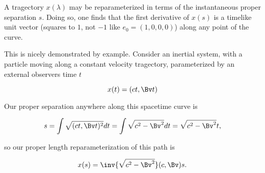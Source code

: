 %
%
%

A tragectory $x(\lambda)$ may be reparameterized in terms of the instantaneous proper separation $s$.  Doing so, one finds that the first derivative of $x(s)$ is a timelike unit vector (squares to $1$, not $-1$ like $e_0 = (1, 0, 0, 0)$) along any point of the curve.

This is nicely demonstrated by example.
%
%
Consider an inertial system, with a particle moving along a constant velocity tragectory, parameterized by an external observers time $t$

\begin{equation}\label{eqn:grahamSchmidtLorentz:440}
x(t) = (c t, \Bv t)
\end{equation}

Our proper separation anywhere along this spacetime curve is

\begin{equation}\label{eqn:grahamSchmidtLorentz:460}
s = \int \sqrt{(c t, \Bv t)^2} dt = \int \sqrt{ c^2 - \Bv^2 } dt = \sqrt{ c^2 - \Bv^2 } t,
\end{equation}

so our proper length reparameterization of this path is

\begin{equation}\label{eqn:grahamSchmidtLorentz:480}
x(s) = \inv{\sqrt{c^2 - \Bv^2}} (c, \Bv) s.
\end{equation}

